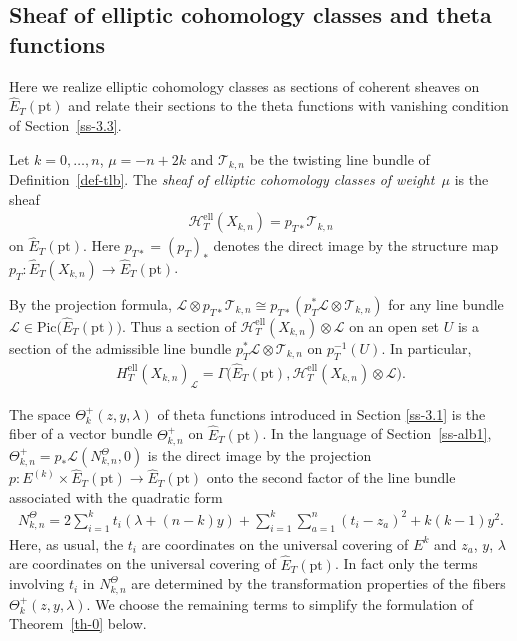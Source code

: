 \documentclass[pdftex]{sigma}
\numberwithin{equation}{section}
\begin{document}
\subsection{Sheaf of elliptic cohomology classes and theta functions}
Here we realize elliptic cohomology classes as sections of coherent sheaves on $\hat E_T(\mathrm{pt})$ and relate their sections to the theta functions with vanishing condition of Section~\ref{ss-3.3}.
\begin{Definition} Let $k=0,\dots,n$, $\mu=-n+2k$ and $\mathcal T_{k,n}$ be the twisting line bundle of Definition~\ref{def-tlb}. The {\em sheaf of elliptic cohomology classes of weight~$\mu$} is the sheaf
 \begin{gather*}
 \mathcal H_T^{\mathrm{ell}}(X_{k,n})=p_{T*}\mathcal T_{k,n}
 \end{gather*}
 on $\hat E_T(\mathrm{pt})$. Here $p_{T*}=(p_T)_*$ denotes the direct image by the structure map $p_T\colon \hat E_T(X_{k,n})\to \hat E_T(\mathrm{pt})$.
\end{Definition}
By the projection formula, $\mathcal L\otimes p_{T*}\mathcal T_{k,n}\cong p_{T*}(p_T^*\mathcal L\otimes \mathcal T_{k,n})$ for any line bundle $\mathcal L\in \mathrm{Pic}\big(\hat E_T(\mathrm{pt})\big)$. Thus a section of $\mathcal H_T^{\mathrm{ell}}(X_{k,n})\otimes \mathcal L$ on an open set $U$ is a section of the admissible line bundle $p_T^*\mathcal L\otimes \mathcal T_{k,n}$ on $p_T^{-1}(U)$. In particular,
\begin{gather*}
 H^{\mathrm{ell}}_T(X_{k,n})_{\mathcal L}=\Gamma\big(\hat E_T(\mathrm{pt}),\mathcal H^{\mathrm{ell}}_T(X_{k,n})\otimes\mathcal L\big).
\end{gather*}

The space $\Theta^+_k(z,y,\lambda)$ of theta functions introduced in Section \ref{ss-3.1} is the fiber of a vector bundle $\Theta^+_{k,n}$ on $\hat E_T(\mathrm{pt})$. In the language of Section~\ref{ss-alb1}, $\Theta^+_{k,n}=p_*\mathcal L(N^\Theta_{k,n},0)$ is the direct image by the projection $p\colon E^{(k)}\times\hat E_T(\mathrm{pt})\to \hat E_T(\mathrm{pt})$ onto the second factor of the line bundle associated with the quadratic form
\begin{gather}\label{e-NTheta}
 N^\Theta_{k,n} =2\sum_{i=1}^kt_i(\lambda+(n-k)y)+\sum_{i=1}^k\sum_{a=1}^n(t_i-z_a)^2+k(k-1)y^2.
\end{gather}
Here, as usual, the $t_i$ are coordinates on the universal covering of $E^k$ and $z_a$, $y$, $\lambda$ are coordinates on the universal covering of $\hat E_T(\mathrm{pt})$. In fact only the terms involving $t_i$ in $N^\Theta_{k,n}$ are determined by the transformation properties of the fibers $\Theta^+_k(z,y,\lambda)$. We choose the remaining terms to simplify the formulation of Theorem~\ref{th-0} below.
\end{document}
